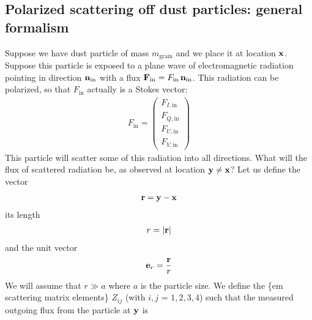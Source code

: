 \documentclass[letterpaper,10pt,english]{sphinxmanual}
\begin{document}
\subsection{Polarized scattering off dust particles: general formalism}
\label{\detokenize{dustradtrans:polarized-scattering-off-dust-particles-general-formalism}}
Suppose we have  dust particle of mass \(m_{\mathrm{grain}}\) and we
place it at location \({\bf x}\). Suppose this particle is exposed to a
plane wave of electromagnetic radiation pointing in direction \({\bf
n}_{\mathrm{in}}\) with a flux \({\bf F}_{\mathrm{in}}=F_{\mathrm{in}}\,{\bf
n}_{\mathrm{in}}\). This radiation can be polarized, so that
\(F_{\mathrm{in}}\) actually is a Stokes vector:
\begin{equation*}
\begin{split}F_{\mathrm{in}} = \left(\begin{matrix}
F_{I,\mathrm{in}}\\
F_{Q,\mathrm{in}}\\
F_{U,\mathrm{in}}\\
F_{V,\mathrm{in}}
\end{matrix}\right)\end{split}
\end{equation*}
This particle will scatter some of this radiation into all directions.
What will the flux of scattered radiation be, as observed at location
\({\bf y}\neq{\bf x}\)? Let us define the vector
\begin{equation*}
\begin{split}{\bf r} = {\bf y} - {\bf x}\end{split}
\end{equation*}
its length
\begin{equation*}
\begin{split}r = |{\bf r}|\end{split}
\end{equation*}
and the unit vector
\begin{equation*}
\begin{split}{\bf e}_r = \frac{{\bf r}}{r}\end{split}
\end{equation*}
We will assume that \(r\gg a\) where \(a\) is the particle size.  We
define the \{em scattering matrix elements\} \(Z_{ij}\) (with \(i,j\) =
\(1,2,3,4\)) such that the measured outgoing flux from the particle at
\({\bf y}\) is
\end{document}

